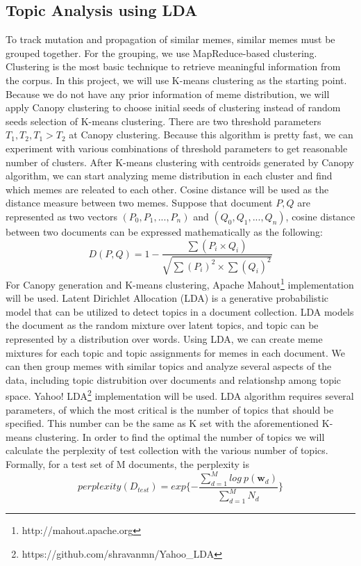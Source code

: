 \documentclass{sig-alternate}
\begin{document}
\subsection{Topic Analysis using LDA}
To track mutation and propagation of similar memes, similar memes must be grouped together. For the grouping, we use MapReduce-based clustering. Clustering is the most basic technique to retrieve meaningful information from the corpus. In this project, we will use K-means clustering as the starting point. Because we do not have any prior information of meme distribution, we will apply Canopy clustering \cite{McCallum2000} to choose initial seeds of clustering instead of random seeds selection of K-means clustering. There are two threshold parameters $T_1,T_2,T_1>T_2$ at Canopy clustering. Because this algorithm is pretty fast, we can experiment with various combinations of threshold parameters to get reasonable number of clusters. After K-means clustering with centroids generated by Canopy algorithm, we can start analyzing meme distribution in each cluster and find which memes are releated to each other.
Cosine distance will be used as the distance measure between two memes. Suppose that document $P,Q$ are represented as two vectors $(P_0, P_1,...,P_n)$ and $(Q_0, Q_1,...,Q_n)$, cosine distance between two documents can be expressed mathematically as the following:
\begin{displaymath}
D(P,Q)=1-\frac{\sum(P_i \times Q_i)}{\sqrt{\sum{(P_i)^2} \times \sum{(Q_i)^2}}}
\end{displaymath}
For Canopy generation and K-means clustering, Apache Mahout\footnote{http://mahout.apache.org} implementation will be used. 
Latent Dirichlet Allocation (LDA)\cite{Blei2003} is a generative probabilistic model that can be utilized to detect topics in a document collection. LDA models the document as the random mixture over latent topics, and topic can be represented by a distribution over words. Using LDA, we can create meme mixtures for each topic and topic assignments for memes in each document. We can then group memes with similar topics and analyze several aspects of the data, including topic distrubition over documents and relationshp among topic space. Yahoo! LDA\footnote{https://github.com/shravanmn/Yahoo\_LDA}  implementation will be used. LDA algorithm requires several parameters, of which the most critical is the number of topics that should be specified. This number can be the same as K set with the aforementioned K-means clustering. In order to find the optimal the number of topics we will calculate the perplexity of test collection with the various number of topics. Formally, for a test set of M documents, the perplexity is
\begin{displaymath}
 perplexity(D_{test})=exp\{-\frac{\sum_{d=1}^M log\ p(\mathbf{w}_d)}{\sum_{d=1}^M N_d}\}
\end{displaymath}
\end{document}
